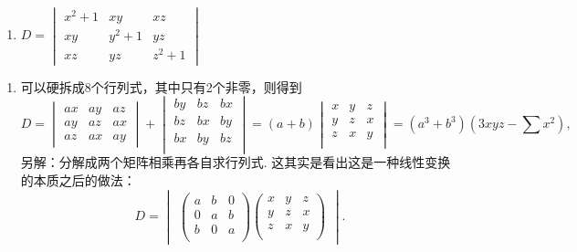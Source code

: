 \begin{exercise}
\begin{exgroup}
\begin{multicols}{2}
\begin{enumerate}
                \item $D=\begin{vmatrix}
                              x^2+1 & xy    & xz    \\
                              xy    & y^2+1 & yz    \\
                              xz    & yz    & z^2+1
                          \end{vmatrix}$
            \end{enumerate} \end{multicols}
        \begin{answer}
            \begin{enumerate}
                \item 可以硬拆成8个行列式，其中只有2个非零，则得到
                      \[D=\begin{vmatrix}
                              ax & ay & az \\
                              ay & az & ax \\
                              az & ax & ay
                          \end{vmatrix}+\begin{vmatrix}
                              by & bz & bx \\
                              bz & bx & by \\
                              bx & by & bz \\
                          \end{vmatrix}=(a+b)\begin{vmatrix}
                              x & y & z \\
                              y & z & x \\
                              z & x & y \\
                          \end{vmatrix}=(a^3+b^3)(3xyz-\sum x^2),\]
                      另解：分解成两个矩阵相乘再各自求行列式. 这其实是看出这是一种线性变换的本质之后的做法：
                      \[D=\begin{vmatrix}
                              \begin{pmatrix}
                                  a & b & 0 \\
                                  0 & a & b \\
                                  b & 0 & a \\
                              \end{pmatrix}
                              \begin{pmatrix}
                                  x & y & z \\
                                  y & z & x \\
                                  z & x & y \\
                              \end{pmatrix}
                          \end{vmatrix}.\]


\end{enumerate}
\end{answer}
\end{exgroup}
\end{exercise}

